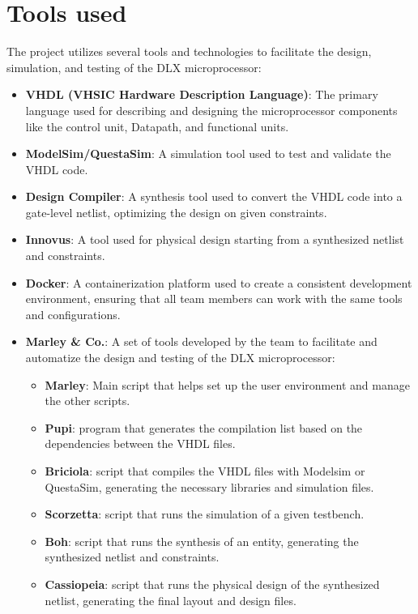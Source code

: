\section{Tools used}
The project utilizes several tools and technologies to facilitate the design, simulation, and testing of the DLX microprocessor:
\begin{itemize}
    \item \textbf{VHDL (VHSIC Hardware Description Language)}: The primary language used for describing and designing the microprocessor components like the control unit, Datapath, and functional units.
    \item \textbf{ModelSim/QuestaSim}: A simulation tool used to test and validate the VHDL code.
    \item \textbf{Design Compiler}: A synthesis tool used to convert the VHDL code into a gate-level netlist, optimizing the design on given constraints.
    \item \textbf{Innovus}: A tool used for physical design starting from a synthesized netlist and constraints.
    \item \textbf{Docker}: A containerization platform used to create a consistent development environment, ensuring that all team members can work with the same tools and configurations.
    \item \textbf{Marley \& Co.}: A set of tools developed by the team to facilitate and automatize the design and testing of the DLX microprocessor:
    \begin{itemize}
        \item \textbf{Marley}: Main script that helps set up the user environment and manage the other scripts.
        \item \textbf{Pupi}: program that generates the compilation list based on the dependencies between the VHDL files. 
        \item \textbf{Briciola}: script that compiles the VHDL files with Modelsim or QuestaSim, generating the necessary libraries and simulation files.
        \item \textbf{Scorzetta}: script that runs the simulation of a given testbench.
        \item \textbf{Boh}: script that runs the synthesis of an entity, generating the synthesized netlist and constraints. 
        \item \textbf{Cassiopeia}: script that runs the physical design of the synthesized netlist, generating the final layout and design files.
    \end{itemize}
\end{itemize}

